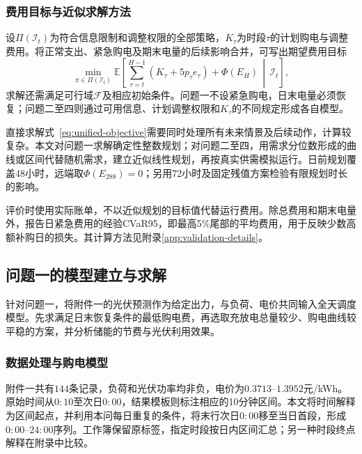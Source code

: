 \subsubsection{费用目标与近似求解方法}

设$\Pi(\mathcal I_t)$为符合信息限制和调整权限的全部策略，$K_\tau$为时段$\tau$的计划购电与调整费用。将正常支出、紧急购电及期末电量的后续影响合并，可写出期望费用目标
\begin{equation}
  \min_{\pi\in\Pi(\mathcal I_t)}
  \mathbb E\left[
    \sum_{\tau=t}^{H-1}(K_\tau+5p_\tau e_\tau)
    +\Phi(E_H)\,\middle|\,\mathcal I_t
  \right],
  \label{eq:unified-objective}
\end{equation}
求解还需满足可行域$\mathcal F$及相应初始条件。问题一不设紧急购电，日末电量必须恢复；问题二至四则通过可用信息、计划调整权限和$K_\tau$的不同规定形成各自模型。

直接求解式~\eqref{eq:unified-objective}需要同时处理所有未来情景及后续动作，计算较复杂。本文对问题一求解确定性整数规划；对问题二至四，用需求分位数形成的曲线或区间代替随机需求，建立近似线性规划，再按真实供需模拟运行。日前规划覆盖48小时，远端取$\Phi(E_{288})=0$；另用72小时及固定残值方案检验有限规划时长的影响。

评价时使用实际账单，不以近似规划的目标值代替运行费用。除总费用和期末电量外，报告日紧急费用的经验CVaR95，即最高5\%尾部的平均费用，用于反映少数高额补购日的损失。其计算方法见附录\ref{app:validation-details}。

\subsection{问题一的模型建立与求解}
\label{sec:problem1}

针对问题一，将附件一的光伏预测作为给定出力，与负荷、电价共同输入全天调度模型。先求满足日末恢复条件的最低购电费，再选取充放电总量较少、购电曲线较平稳的方案，并分析储能的节费与光伏利用效果。

\subsubsection{数据处理与购电模型}

附件一共有$144$条记录，负荷和光伏功率均非负，电价为$0.3713$--$1.3952$元/kWh。原始时间从$0{:}10$至次日$0{:}00$，结果模板则标注相应的10分钟区间。本文将时间解释为区间起点，并利用本问每日重复的条件，将末行次日$0{:}00$移至当日首段，形成$0{:}00$--$24{:}00$序列。工作簿保留原标签，指定时段按日内区间汇总；另一种时段终点解释在附录中比较。

